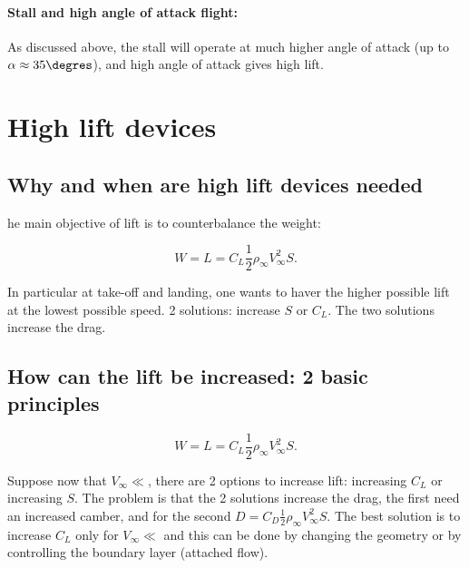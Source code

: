 \documentclass[british,french,11pt, a4paper, openany]{article}
\begin{document}
\paragraph{Stall and high angle of attack flight:}
As discussed above, the stall will operate at much higher angle of attack (up to $\alpha \approx 35\degres$), and high angle of attack gives high lift.



\section{High lift devices}
\subsection{Why and when are high lift devices needed}
he main objective of lift is to counterbalance the weight: 

\begin{equation}
W = L = C_L \frac{1}{2} \rho _\infty V_\infty ^2 S.
\end{equation}

In particular at take-off and landing, one wants to haver the higher possible lift at the lowest possible speed. 2 solutions: increase $S$ or $C_L$. The two solutions increase the drag.

\subsection{How can the lift be increased: 2 basic principles}

\begin{equation}
W = L = C_L \frac{1}{2} \rho _\infty V_\infty ^2 S.
\end{equation}

Suppose now that $V_\infty \ll$, there are 2 options to increase lift: increasing $C_L$ or increasing $S$. The problem is that the 2 solutions increase the drag, the first need an increased camber, and for the second $D = C_D \frac{1}{2} \rho _\infty V_\infty ^2 S$. The best solution is to increase $C_L$ only for $V_\infty \ll$ and this can be done by changing the geometry or by controlling the boundary layer (attached flow). 
\end{document}
